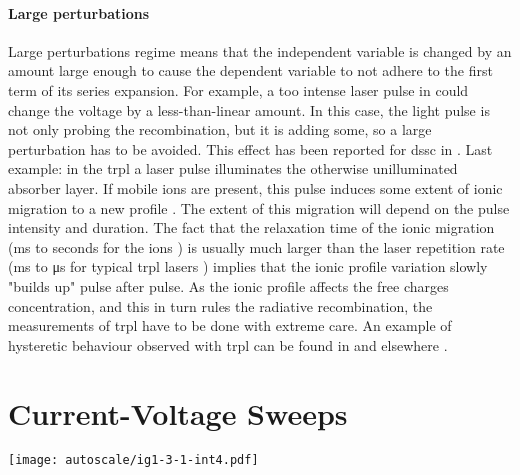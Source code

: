 		\paragraph{Large perturbations} \label{perturbation}
		Large perturbations regime means that the independent variable is changed by an amount large enough to cause the dependent variable to not adhere to the first term of its series expansion.
		For example, a too intense laser pulse in  could change the voltage by a less\hyp{}than\hyp{}linear amount.
		In this case, the light pulse is not only probing the recombination, but it is adding some, so a large perturbation has to be avoided.
		This effect has been reported for \gls{dssc} in .
		Last example: in the \glsdesc{trpl} a laser pulse illuminates the otherwise unilluminated absorber layer.
		If mobile ions are present, this pulse induces some extent of ionic migration to a new profile \cite{Levine2018}.
		The extent of this migration will depend on the pulse intensity and duration.
		The fact that the relaxation time of the ionic migration (\si{\ms} to seconds for the ions \cite{Jacobs2018}) is usually much larger than the laser repetition rate (\si{\ms} to \si{\us} for typical \gls{trpl} lasers \cite{EdinburghInstruments}) implies that the ionic profile variation slowly "builds up" pulse after pulse.
		As the ionic profile affects the free charges concentration, and this in turn rules the radiative recombination, the measurements of \gls{trpl} have to be done with extreme care.
		An example of hysteretic behaviour observed with \gls{trpl} can be found in  and elsewhere \cite{Chen2015,Chen2017}.

\section{Current-Voltage Sweeps}

	\begin{SCfigure}%
	\centering
	\texttt{[image: autoscale/ig1-3-1-int4.pdf]}
	\label{fig:autoscale}
\end{SCfigure}

